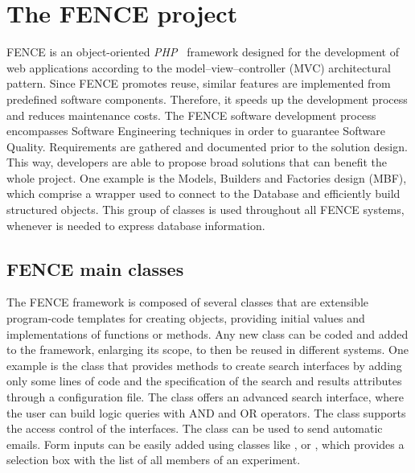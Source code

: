 
\section{The FENCE project}
\label{sec:The_FENCE_project}

FENCE is an object-oriented \textit{PHP}~\cite{php} framework designed for the development of web applications according to the model–view–controller (MVC) architectural pattern.
Since FENCE promotes reuse, similar features are implemented from predefined software components.
Therefore, it speeds up the development process and reduces maintenance costs.
The FENCE software development process encompasses Software Engineering techniques in order to guarantee Software Quality. Requirements are gathered and documented prior to the solution design.
This way, developers are able to propose broad solutions that can benefit the whole project.
One example is the Models, Builders and Factories design (MBF), which comprise a wrapper used to connect to the Database and efficiently build structured objects.
This group of classes is used throughout all FENCE systems, whenever is needed to express database information.


\subsection{FENCE main classes}%
\label{sec:FENCE_main_classes}

The FENCE framework is composed of several classes that are extensible program-code templates for creating objects, providing initial values and implementations of functions or methods.
Any new class can be coded and added to the framework, enlarging its scope, to then be reused in different systems.
One example is the  class that provides methods to create search interfaces by adding only some lines of code and the specification of the search and results attributes through a configuration file.
The  class offers an advanced search interface, where the user can build logic queries with AND and OR operators.
The  class supports the access control of the interfaces.
The  class can be used to send automatic emails.
Form inputs can be easily added using classes like ,  or , which provides a selection box with the list of all members of an experiment.
                    
